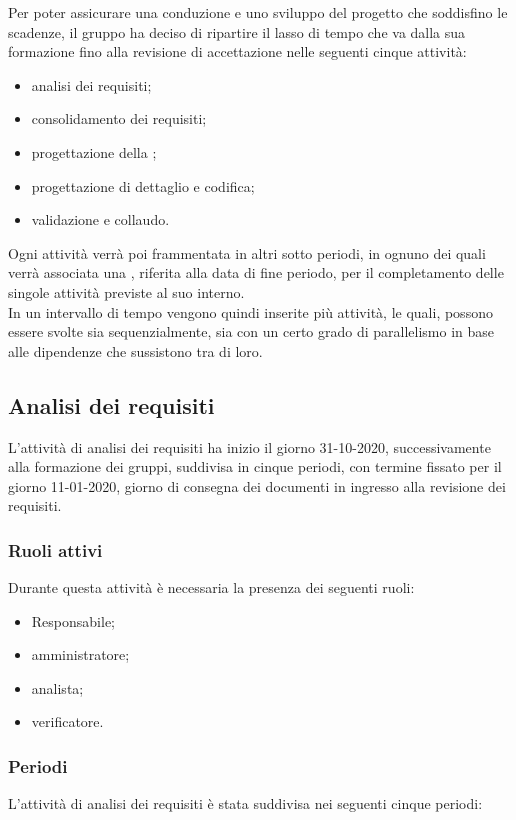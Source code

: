 Per poter assicurare una conduzione e uno sviluppo del progetto che soddisfino le scadenze, il gruppo ha deciso di ripartire il lasso di tempo che va dalla sua formazione fino alla revisione di accettazione nelle seguenti cinque attività:

\begin{itemize}
	\item analisi dei requisiti;
	\item consolidamento dei requisiti;
	\item progettazione della ;
	\item progettazione di dettaglio e codifica;
	\item validazione e collaudo.
\end{itemize}
Ogni attività verrà poi frammentata in altri sotto periodi, in ognuno dei quali verrà associata una ,
riferita alla data di fine periodo, per il completamento delle singole attività previste al suo interno.\\
In un intervallo di tempo vengono quindi inserite più attività, le quali, possono essere svolte sia sequenzialmente, sia con un certo grado di parallelismo in base alle dipendenze che sussistono tra di loro.

\subsection{Analisi dei requisiti}
L’attività di analisi dei requisiti ha inizio il giorno 31-10-2020, successivamente alla formazione dei gruppi, suddivisa in cinque periodi, con termine fissato per il giorno 11-01-2020, giorno di consegna dei documenti in ingresso alla revisione dei requisiti.

\subsubsection{Ruoli attivi}
Durante questa attività è necessaria la presenza dei seguenti ruoli:
\begin{itemize}
	\item Responsabile;
	\item amministratore;
	\item analista;
	\item verificatore.
\end{itemize}

\subsubsection{Periodi}
L'attività di analisi dei requisiti è stata suddivisa nei seguenti cinque periodi:

